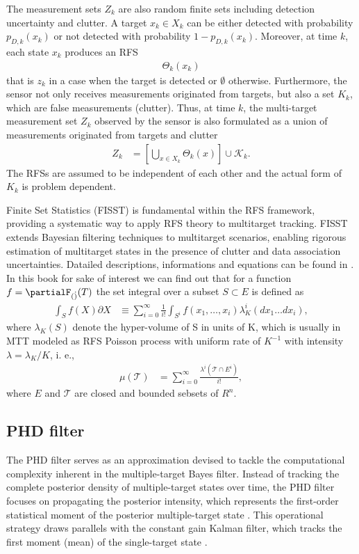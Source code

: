 The measurement sets $Z_k$ are also random finite sets including detection uncertainty and clutter. A target $x_k \in X_k$ can be either detected with probability $p_{D,k}(x_k)$ or not detected with probability $1-p_{D,k}(x_k)$. Moreover, at time $k$, each state $x_k$ produces an RFS
\begin{align}
    \Theta_k(x_k)
\end{align}
that is ${z_k}$ in a case when the target is detected or $\emptyset$ otherwise. Furthermore, the sensor not only
receives measurements originated from targets, but also a set $K_k$, which are false measurements (clutter). Thus, at
time $k$, the multi-target measurement set $Z_k$ observed by the sensor is also formulated as a union of measurements
originated from targets and clutter
\begin{align}
    Z_k &= \left[ \bigcup_{x \in X_k} \Theta_k(x) \right] \cup \mathcal{K}_k. \label{eq:rfs_measurement_union}
\end{align}
The RFSs are assumed to be independent of each other and the actual form of $K_k$ is problem dependent.


Finite Set Statistics (FISST) is fundamental within the RFS framework, providing a systematic way to apply RFS theory
to multitarget tracking. FISST extends Bayesian filtering techniques to multitarget scenarios, enabling rigorous
estimation of multitarget states in the presence of clutter and data association uncertainties. Datailed descriptions, informations and equations can be found in \cite{FISSTgoodman1997}. In this book for sake of interest we can find out that for a function $f=\partialF_{(\dot)}(T)$ the set integral over a subset $S \subset E$ is defined as
\begin{align}
    \int_{S}f(X)\partial X &\equiv \sum_{i=0}^{\infty} \frac{1}{i!}\int_{S^i} f({x_1,\dots,x_i})\lambda_K^i(dx_1\dots dx_i),
\end{align}
where $\lambda_K(S)$ denote the hyper-volume of S in units of K, which is usually in MTT modeled as RFS Poisson process with uniform rate of $K^{-1}$ with intensity $\lambda = \lambda_K/K$, i. e., \cite{VoRFS2003}
\begin{align}
    \mu(\mathcal{T}) &= \sum_{i=0}^{\infty} \frac{\lambda^i(\mathcal{T} \cap E^i)}{i!},
\end{align}
where $E$ and $\mathcal{T}$ are closed and bounded sebsets of $R^n$.

        \subsection{PHD filter}
The PHD filter serves as an approximation devised to tackle the computational complexity inherent in the multiple-target Bayes filter. Instead of tracking the complete posterior density of multiple-target states over time, the PHD filter focuses on propagating the posterior intensity, which represents the first-order statistical moment of the posterior multiple-target state \cite{mahler}. This operational strategy draws parallels with the constant gain Kalman filter, which tracks the first moment (mean) of the single-target state \cite{VoMaPHD2006}.

